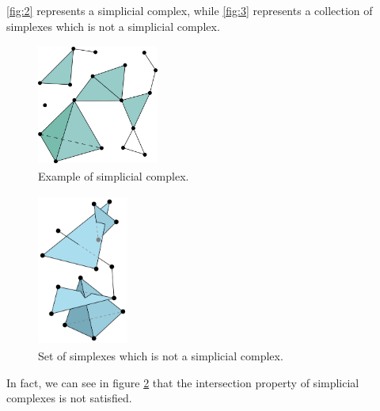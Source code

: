 \documentclass[../1.tex]{subfiles}
\begin{document}
    \autoref{fig:2} represents a simplicial complex, while \autoref{fig:3} represents a collection of simplexes which is not a simplicial complex. 

    
    \begin{figure}[H]
        \centering
        \includegraphics[width=4cm, height=4cm]{sections/1/complex}
        \caption{Example of simplicial complex.}
        \label{fig:2}
    \end{figure} 

    \begin{figure}[H]
        \centering
        \includegraphics[width=3cm, height=5cm]{sections/1/noncomplex}
        \caption{Set of simplexes which is not a simplicial complex.}
        \label{fig:3}
    \end{figure}

    In fact, we can see in figure \ref{fig:3} that the intersection property of simplicial complexes is not satisfied.
\end{document}
